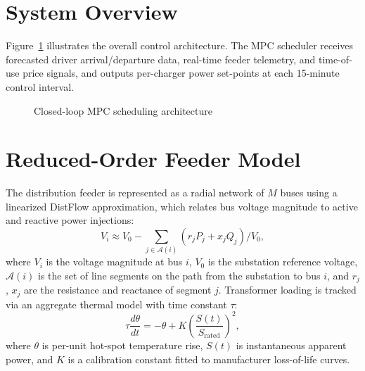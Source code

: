 \documentclass[12pt,twoside]{report}
\begin{document}
\section{System Overview}
Figure~\ref{fig:arch} illustrates the overall control architecture. The MPC scheduler receives
forecasted driver arrival/departure data, real-time feeder telemetry, and time-of-use price
signals, and outputs per-charger power set-points at each 15-minute control interval.

\begin{figure}[htbp]
\centering
{}
\caption{Closed-loop MPC scheduling architecture}
\label{fig:arch}
\end{figure}

\section{Reduced-Order Feeder Model}
The distribution feeder is represented as a radial network of $M$ buses using a linearized
DistFlow approximation, which relates bus voltage magnitude to active and reactive power
injections:
\begin{equation}
V_i \approx V_0 - \sum_{j \in \mathcal{A}(i)} \left( r_j P_j + x_j Q_j \right) / V_0,
\label{eq:distflow}
\end{equation}
where $V_i$ is the voltage magnitude at bus $i$, $V_0$ is the substation reference voltage,
$\mathcal{A}(i)$ is the set of line segments on the path from the substation to bus $i$, and
$r_j$, $x_j$ are the resistance and reactance of segment $j$. Transformer loading is tracked via
an aggregate thermal model with time constant $\tau$:
\begin{equation}
\tau \frac{d\theta}{dt} = -\theta + K \left( \frac{S(t)}{S_{\text{rated}}} \right)^2,
\label{eq:thermal}
\end{equation}
where $\theta$ is per-unit hot-spot temperature rise, $S(t)$ is instantaneous apparent power,
and $K$ is a calibration constant fitted to manufacturer loss-of-life curves.
\end{document}
